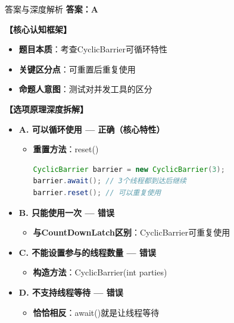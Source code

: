 \documentclass[12pt, a4paper]{ctexart}
\begin{document}
\begin{enumerate}[label=\textbf{\arabic*.}]
	      \begin{bluebox}{答案与深度解析}
		      \textbf{答案：A}

		      \textbf{【核心认知框架】}
		      \begin{itemize}[label={}, leftmargin=*, nosep]
			      \item \textbf{题目本质}：考查CyclicBarrier可循环特性
			      \item \textbf{关键区分点}：可重置后重复使用
			      \item \textbf{命题人意图}：测试对并发工具的区分
		      \end{itemize}

		      \textbf{【选项原理深度拆解】}
					  \begin{itemize}[label={}, leftmargin=*, nosep]

		      \item \textbf{A. 可以循环使用 — 正确（核心特性）}
		      \begin{itemize}[label={}, leftmargin=*, nosep]
			      \item \textbf{重置方法}：reset()
			            \begin{lstlisting}[language=Java]
CyclicBarrier barrier = new CyclicBarrier(3);
barrier.await(); // 3个线程都到达后继续
barrier.reset(); // 可以重复使用
      \end{lstlisting}
		      \end{itemize}

		      \item \textbf{B. 只能使用一次 — 错误}
		      \begin{itemize}[label={}, leftmargin=*, nosep]
			      \item \textbf{与CountDownLatch区别}：CyclicBarrier可重复使用
		      \end{itemize}

		      \item \textbf{C. 不能设置参与的线程数量 — 错误}
		      \begin{itemize}[label={}, leftmargin=*, nosep]
			      \item \textbf{构造方法}：CyclicBarrier(int parties)
		      \end{itemize}

		      \item \textbf{D. 不支持线程等待 — 错误}
		      \begin{itemize}[label={}, leftmargin=*, nosep]
			      \item \textbf{恰恰相反}：await()就是让线程等待
		      \end{itemize}


\end{itemize}
\end{bluebox}
\end{enumerate}
\end{document}
